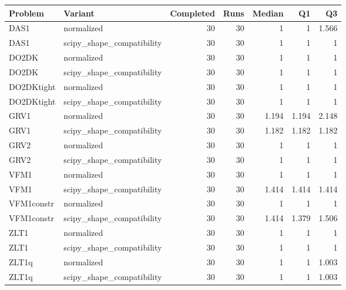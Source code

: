 \begin{tabular}{llrrrrr}
\toprule
Problem & Variant & Completed & Runs & Median & Q1 & Q3 \\
\midrule
DAS1 & normalized & 30 & 30 & 1 & 1 & 1.566 \\
DAS1 & scipy\_shape\_compatibility & 30 & 30 & 1 & 1 & 1 \\
DO2DK & normalized & 30 & 30 & 1 & 1 & 1 \\
DO2DK & scipy\_shape\_compatibility & 30 & 30 & 1 & 1 & 1 \\
DO2DKtight & normalized & 30 & 30 & 1 & 1 & 1 \\
DO2DKtight & scipy\_shape\_compatibility & 30 & 30 & 1 & 1 & 1 \\
GRV1 & normalized & 30 & 30 & 1.194 & 1.194 & 2.148 \\
GRV1 & scipy\_shape\_compatibility & 30 & 30 & 1.182 & 1.182 & 1.182 \\
GRV2 & normalized & 30 & 30 & 1 & 1 & 1 \\
GRV2 & scipy\_shape\_compatibility & 30 & 30 & 1 & 1 & 1 \\
VFM1 & normalized & 30 & 30 & 1 & 1 & 1 \\
VFM1 & scipy\_shape\_compatibility & 30 & 30 & 1.414 & 1.414 & 1.414 \\
VFM1constr & normalized & 30 & 30 & 1 & 1 & 1 \\
VFM1constr & scipy\_shape\_compatibility & 30 & 30 & 1.414 & 1.379 & 1.506 \\
ZLT1 & normalized & 30 & 30 & 1 & 1 & 1 \\
ZLT1 & scipy\_shape\_compatibility & 30 & 30 & 1 & 1 & 1 \\
ZLT1q & normalized & 30 & 30 & 1 & 1 & 1.003 \\
ZLT1q & scipy\_shape\_compatibility & 30 & 30 & 1 & 1 & 1.003 \\
\bottomrule
\end{tabular}
